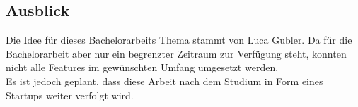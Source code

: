 \subsection{Ausblick}
Die Idee für dieses Bachelorarbeits Thema stammt von Luca Gubler. Da für die Bachelorarbeit aber nur ein begrenzter Zeitraum zur Verfügung steht, konnten nicht alle Features im gewünschten Umfang umgesetzt werden. \\

Es ist jedoch geplant, dass diese Arbeit nach dem Studium in Form eines Startups weiter verfolgt wird.


\newpage